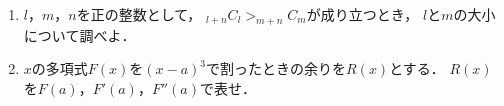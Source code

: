 \documentclass[../../main.tex]{subfiles}
\begin{document}
\begin{enumerate}
  \item $l$，$m$，$n$を正の整数として，
    $_{l+n}C_l>_{m+n}C_m$が成り立つとき，
    $l$と$m$の大小について調べよ．
  \item $x$の多項式$F(x)$を${(x-a)}^3$で割ったときの余りを$R(x)$とする．
    $R(x)$を$F(a)$，$F'(a)$，$F''(a)$で表せ．
\end{enumerate}
\end{document}
